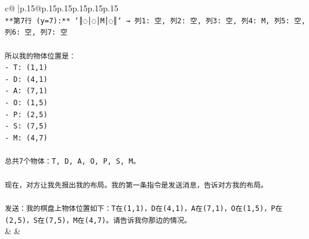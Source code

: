 \documentclass{article}
\begin{document}
{\begin{supertabular}{c@{$\;$}|p{.15\linewidth}@{}p{.15\linewidth}p{.15\linewidth}p{.15\linewidth}p{.15\linewidth}p{.15\linewidth}}
{{{\\ 
\texttt{**第7行 (y=7):** `║◌│◌│M│◌║` → 列1: 空, 列2: 空, 列3: 空, 列4: M, 列5: 空, 列6: 空, 列7: 空} \\
\\ 
\texttt{所以我的物体位置是：} \\
\texttt{{-} T: (1,1)} \\
\texttt{{-} D: (4,1)} \\
\texttt{{-} A: (7,1)} \\
\texttt{{-} O: (1,5)} \\
\texttt{{-} P: (2,5)} \\
\texttt{{-} S: (7,5)} \\
\texttt{{-} M: (4,7)} \\
\\ 
\texttt{总共7个物体：T, D, A, O, P, S, M。} \\
\\ 
\texttt{现在，对方让我先报出我的布局。我的第一条指令是发送消息，告诉对方我的布局。} \\
\\ 
\texttt{发送：我的棋盘上物体位置如下：T在(1,1)，D在(4,1)，A在(7,1)，O在(1,5)，P在(2,5)，S在(7,5)，M在(4,7)。请告诉我你那边的情况。} \\
            }
        }
    }
    & & \\ \\


\end{supertabular}}
\end{document}
